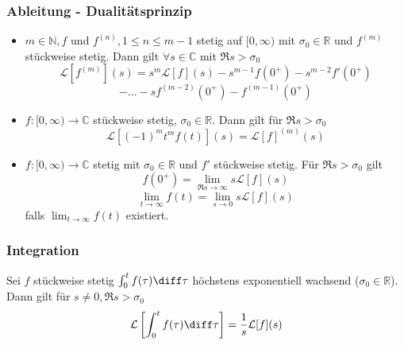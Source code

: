 \begin{sectionbox}
    \subsubsection{Ableitung - Dualitätsprinzip}
    \begin{itemize}
        \item $m\in\mathbb N, f$ und $f^{(n)}, 1 \le n\le m-1$ stetig auf $[0,\infty)$ mit $\sigma_0\in\mathbb R$ und $f^{(m)}$ stückweise stetig.
              Dann gilt $\forall s\in\mathbb C$ mit $\Re{s} > \sigma_0$
              \begin{equation*}
                  \mathcal L[f^{(m)}](s) = s^m\mathcal L[f](s) - s^{m-1}f(0^+) - s^{m-2}f'(0^+)
              \end{equation*}
              \begin{equation*}
                  - ... - sf^{(m-2)}(0^+) - f^{(m-1)}(0^+)
              \end{equation*}
        \item $f:[0,\infty)\rightarrow\mathbb C$ stückweise stetig, $\sigma_0\in\mathbb R$.
              Dann gilt für $\Re{s} > \sigma_0$
              \begin{equation*}
                  \mathcal L[(-1)^mt^mf(t)](s) = \mathcal L[f]^{(m)}(s)
              \end{equation*}
        \item $f: [0,\infty) \rightarrow \mathbb C$ stetig mit $\sigma_0\in\mathbb R$ und $f'$ stückweise stetig. Für $\Re{s} > \sigma_0$ gilt
              \begin{equation*}
                  f(0^+)=\lim_{\Re{s}\rightarrow\infty}s\mathcal L[f](s)
              \end{equation*}
              \begin{equation*}
                  \lim_{t\rightarrow\infty}f(t) = \lim_{s\rightarrow 0}s\mathcal L[f](s)
              \end{equation*}
              falls $\lim_{t\rightarrow\infty}f(t)$ existiert.
    \end{itemize}
\end{sectionbox}

\begin{sectionbox}
    \subsubsection{Integration}
    Sei $f$ stückweise stetig $\int_0^t f(\tau)\diff\tau$ höchstens exponentiell wachsend ($\sigma_0\in\mathbb R$). Dann gilt für $s\ne 0, \Re{s} > \sigma_0$
    \begin{equation*}
        \mathcal L\left[\int_0^t f(\tau)\diff \tau\right] = \frac{1}{s}\mathcal L[f](s)
    \end{equation*}
\end{sectionbox}

